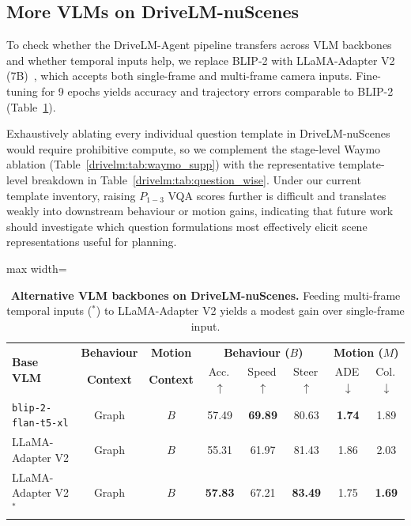 \subsection{More VLMs on DriveLM-nuScenes}\label{drivelm:app:more_vlms}

To check whether the DriveLM-Agent pipeline transfers across VLM backbones and whether temporal inputs help, we replace BLIP-2 with LLaMA-Adapter V2 (7B)~\cite{gao2023llamaadapterv2}, which accepts both single-frame and multi-frame camera inputs. Fine-tuning for 9 epochs yields accuracy and trajectory errors comparable to BLIP-2 (Table~\ref{drivelm:tab:llama}).

Exhaustively ablating every individual question template in DriveLM-nuScenes would require prohibitive compute, so we complement the stage-level Waymo ablation (Table~\ref{drivelm:tab:waymo_supp}) with the representative template-level breakdown in Table~\ref{drivelm:tab:question_wise}. Under our current template inventory, raising $P_{1-3}$ VQA scores further is difficult and translates weakly into downstream behaviour or motion gains, indicating that future work should investigate which question formulations most effectively elicit scene representations useful for planning.

\begin{table}[t]
  \centering
  \caption[Other base VLMs on DriveLM-nuScenes]{\textbf{Alternative VLM backbones on DriveLM-nuScenes.} Feeding multi-frame temporal inputs ($^{*}$) to LLaMA-Adapter V2 yields a modest gain over single-frame input.}
  \label{drivelm:tab:llama}
  \begin{adjustbox}{max width=\textwidth}
  \begin{tabular}{l|cc|ccc|cc}
    \toprule
    \multirow{2}{*}{\textbf{Base VLM}} & \textbf{Behaviour} & \textbf{Motion} & \multicolumn{3}{c|}{\textbf{Behaviour ($B$)}} & \multicolumn{2}{c}{\textbf{Motion ($M$)}} \\
    & \textbf{Context} & \textbf{Context} & Acc.\,$\uparrow$ & Speed\,$\uparrow$ & Steer\,$\uparrow$ & ADE\,$\downarrow$ & Col.\,$\downarrow$ \\
    \midrule
    \texttt{blip-2-flan-t5-xl} & Graph & $B$ & 57.49 & \textbf{69.89} & 80.63 & \textbf{1.74} & 1.89 \\
    \rowcolor[gray]{0.9} LLaMA-Adapter V2 & Graph & $B$ & 55.31 & 61.97 & 81.43 & 1.86 & 2.03 \\
    \rowcolor[gray]{0.9} LLaMA-Adapter V2$^{*}$ & Graph & $B$ & \textbf{57.83} & 67.21 & \textbf{83.49} & 1.75 & \textbf{1.69} \\
    \bottomrule
  \end{tabular}
  \end{adjustbox}
\end{table}

